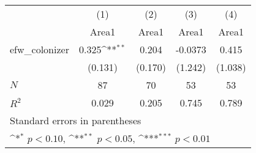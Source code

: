 {
\def\sym#1{\ifmmode^{#1}\else\(^{#1}\)\fi}
\begin{tabular}{l*{4}{c}}
\hline\hline
            &\multicolumn{1}{c}{(1)}&\multicolumn{1}{c}{(2)}&\multicolumn{1}{c}{(3)}&\multicolumn{1}{c}{(4)}\\
            &\multicolumn{1}{c}{Area1}&\multicolumn{1}{c}{Area1}&\multicolumn{1}{c}{Area1}&\multicolumn{1}{c}{Area1}\\
\hline
efw\_colonizer&       0.325\sym{**} &       0.204         &     -0.0373         &       0.415         \\
            &     (0.131)         &     (0.170)         &     (1.242)         &     (1.038)         \\
\hline
\(N\)       &          87         &          70         &          53         &          53         \\
\(R^{2}\)   &       0.029         &       0.205         &       0.745         &       0.789         \\
\hline\hline
\multicolumn{5}{l}{\footnotesize Standard errors in parentheses}\\
\multicolumn{5}{l}{\footnotesize \sym{*} \(p<0.10\), \sym{**} \(p<0.05\), \sym{***} \(p<0.01\)}\\
\end{tabular}
}
